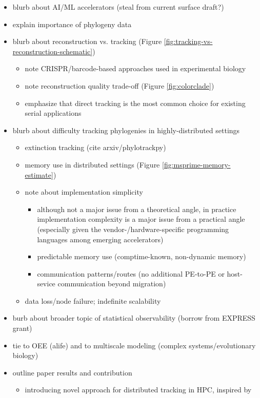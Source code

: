 \begin{itemize}
\item blurb about AI/ML accelerators (steal from current surface draft?)
\item explain importance of phylogeny data
\item blurb about reconstruction vs. tracking (Figure \ref{fig:tracking-vs-reconstruction-schematic})
    \begin{itemize}
    \item note CRISPR/barcode-based approaches used in experimental biology
    \item note reconstruction quality trade-off (Figure \ref{fig:colorclade})
    \item emphasize that direct tracking is the most common choice for existing serial applications
    \end{itemize}
\item blurb about difficulty tracking phylogenies in highly-distributed settings
   \begin{itemize}
   \item extinction tracking (cite arxiv/phylotrackpy)
   \item memory use in distributed settings (Figure \ref{fig:msprime-memory-estimate})
   \item note about implementation simplicity
      \begin{itemize}
      \item although not a major issue from a theoretical angle, in practice implementation complexity is a major issue from a practical angle (especially given the vendor-/hardware-specific programming languages among emerging accelerators)
      \item predictable memory use (comptime-known, non-dynamic memory)
      \item communication patterns/routes (no additional PE-to-PE or host-sevice communication beyond migration)
      \end{itemize}
   \item data loss/node failure; indefinite scalability
   \end{itemize}
\item burb about broader topic of statistical observability (borrow from EXPRESS grant)
\item tie to OEE (alife) and to multiscale modeling (complex systems/evolutionary biology)
\item outline paper results and contribution
   \begin{itemize}
   \item introducing novel approach for distributed tracking in HPC, inspired by

\end{itemize}
\end{itemize}
